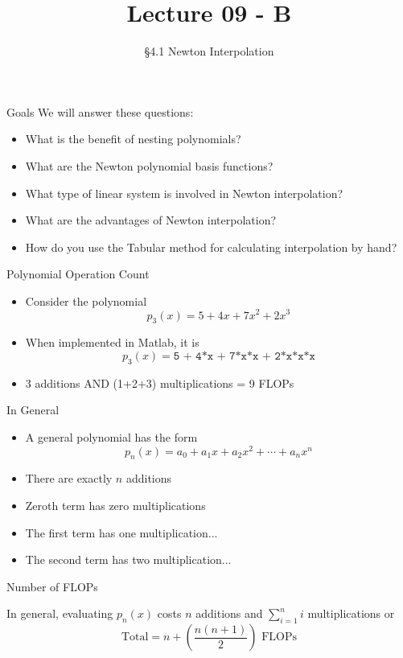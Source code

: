 \documentclass[10pt]{beamer}
\title[Math/CS 375]{Lecture 09 - B}
\subtitle{\S 4.1 Newton Interpolation }
\begin{document}
\begin{frame}
  \titlepage
\end{frame}

\begin{frame}{Goals}
We will answer these questions:\\[3mm]
\begin{itemize}
    \item What is the benefit of nesting polynomials? 
    \item What are the Newton polynomial basis functions?
    \item What type of linear system is involved in Newton interpolation?
    \item What are the advantages of Newton interpolation? 
    \item How do you use the Tabular method for calculating interpolation by hand?
\end{itemize}
\end{frame}



\begin{frame}{Polynomial Operation Count}
\begin{itemize}
    \item Consider the polynomial   
    $$p_3(x) = 5 + 4x +7x^2 + 2x^3$$

    \item When implemented in Matlab, it is 
        $$p_3(x) = \texttt{5 + 4*x + 7*x*x + 2*x*x*x}$$

    \item 3 additions AND (1+2+3) multiplications = 9 FLOPs\\[3mm]

   
\end{itemize}
\end{frame}

\begin{frame}{In General}

\begin{itemize}
    \item A general polynomial has the form 
    $$
    p_n(x) =  a_0 + a_1x+ a_2x^2+\cdots +a_nx^n
    $$
    \item There are exactly $n$ additions 
    \vfill 
    \item Zeroth term has zero multiplications
    \vfill 
    \item The first term has one multiplication... 
    \vfill 
    \item The second term has two multiplication... 
    \vfill 
\end{itemize}
\begin{block}{Number of FLOPs}
    
    In general, evaluating $p_n(x)$ costs $n$ additions and $\sum_{i=1}^n i$ multiplications or 
    $$\text{Total} = n+\left(\frac{n(n+1)}{2}\right) \text{ FLOPs}$$
\end{block}
\end{frame}
\end{document}
